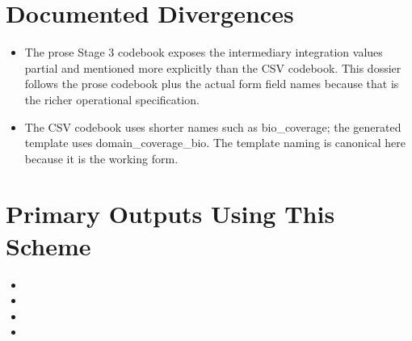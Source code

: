 \documentclass[11pt]{article}
\begin{document}
\section*{Documented Divergences}
\begin{itemize}
\item The prose Stage 3 codebook exposes the intermediary integration values partial and mentioned more explicitly than the CSV codebook. This dossier follows the prose codebook plus the actual form field names because that is the richer operational specification.
\item The CSV codebook uses shorter names such as bio\_coverage; the generated template uses domain\_coverage\_bio. The template naming is canonical here because it is the working form.
\end{itemize}

\section*{Primary Outputs Using This Scheme}
\begin{itemize}
\item {}
\item {}
\item {}
\item {}
\end{itemize}
\end{document}
